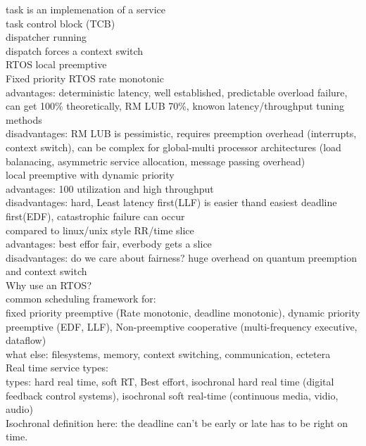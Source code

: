 \documentclass{article}
\begin{document}
task is an implemenation of a service\\
task control block (TCB)\\
dispatcher running\\
dispatch forces a context switch\\


RTOS local preemptive\\
Fixed priority RTOS rate monotonic\\
advantages: deterministic latency, well established, predictable overload failure, can get 100\% theoretically, RM LUB 70\%, knowon latency/throughput tuning methods\\
disadvantages: RM LUB is pessimistic, requires preemption overhead (interrupts, context switch), can be complex for global-multi processor architectures (load balanacing, asymmetric service allocation, message passing overhead)\\

local preemptive with dynamic priority\\
advantages: 100 utilization and high throughput\\
disadvantages: hard, Least latency first(LLF) is easier thand easiest deadline first(EDF), catastrophic failure can occur\\

compared to linux/unix style RR/time slice\\
advantages: best effor fair, everbody gets a slice\\
disadvantages: do we care about fairness? huge overhead on quantum preemption and context switch\\

Why use an RTOS?\\
common scheduling framework for:\\
fixed priority preemptive (Rate monotonic, deadline monotonic), dynamic priority preemptive (EDF, LLF), Non-preemptive cooperative (multi-frequency executive, dataflow)\\
what else: filesystems, memory, context switching, communication, ectetera\\

Real time service types:\\
types: hard real time, soft RT, Best effort, isochronal hard real time (digital feedback control systems), isochronal soft real-time (continuous media, vidio, audio)\\
Isochronal definition here: the deadline can't be early or late has to be right on time.\\
\end{document}
